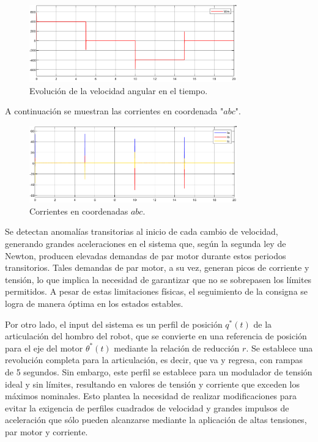 \documentclass{article}
\begin{document}
\begin{figure}[H]
    \centering
    \includegraphics[width=0.8\textwidth]{5.2.4.a.4.png}
    \caption{Evolución de la velocidad angular en el tiempo.}
\end{figure}

A continuación se muestran las corrientes en coordenada "$abc$".

\begin{figure}[H]
    \centering
    \includegraphics[width=0.8\textwidth]{5.2.4.a.6.png}
    \caption{Corrientes en coordenadas $abc$.}
\end{figure}

Se detectan anomalías transitorias al inicio de cada cambio de velocidad, generando grandes 
aceleraciones en el sistema que, según la segunda ley de Newton, producen elevadas demandas de 
par motor durante estos periodos transitorios. Tales demandas de par motor, a su vez, generan 
picos de corriente y tensión, lo que implica la necesidad de garantizar que no se sobrepasen los 
límites permitidos. A pesar de estas limitaciones físicas, el seguimiento de la consigna se logra 
de manera óptima en los estados estables.

Por otro lado, el input del sistema es un perfil de posición $q^*(t)$ de la articulación del hombro 
del robot, que se convierte en una referencia de posición para el eje del motor $\theta^*(t)$ mediante la 
relación de reducción $r$. Se establece una revolución completa para la articulación, es decir, que 
va y regresa, con rampas de 5 segundos. Sin embargo, este perfil se establece para un modulador de 
tensión ideal y sin límites, resultando en valores de tensión y corriente que exceden los máximos 
nominales. Esto plantea la necesidad de realizar modificaciones para evitar la exigencia de perfiles 
cuadrados de velocidad y grandes impulsos de aceleración que sólo pueden alcanzarse mediante la 
aplicación de altas tensiones, par motor y corriente.
\end{document}
